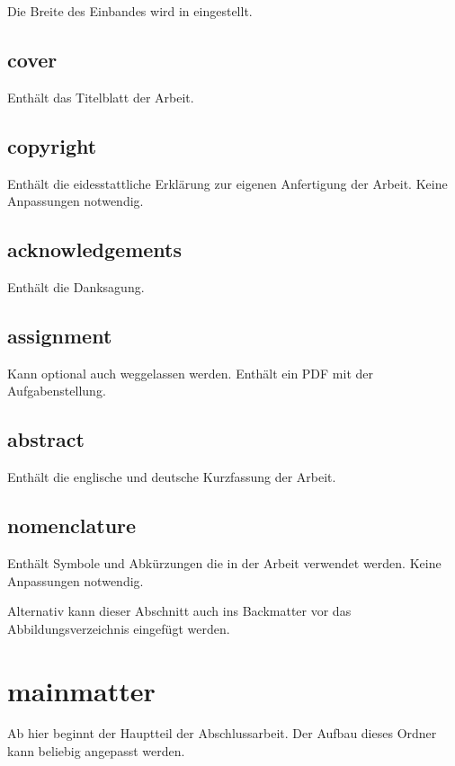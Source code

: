 Die Breite des Einbandes wird in  eingestellt.

\subsection*{cover}

Enthält das Titelblatt der Arbeit. 

\subsection*{copyright}

Enthält die eidesstattliche Erklärung zur eigenen Anfertigung der Arbeit. Keine Anpassungen notwendig.

\subsection*{acknowledgements}

Enthält die Danksagung. 

\subsection*{assignment}

Kann optional auch weggelassen werden. Enthält ein PDF mit der Aufgabenstellung.

\subsection*{abstract}

Enthält die englische und deutsche Kurzfassung der Arbeit.

\subsection*{nomenclature}

Enthält Symbole und Abkürzungen die in der Arbeit verwendet werden. Keine Anpassungen notwendig.

Alternativ kann dieser Abschnitt auch ins Backmatter vor das Abbildungsverzeichnis eingefügt werden.

\section*{mainmatter}
\label{section:_A_mainmatter}

Ab hier beginnt der Hauptteil der Abschlussarbeit. Der Aufbau dieses Ordner kann beliebig angepasst werden.

